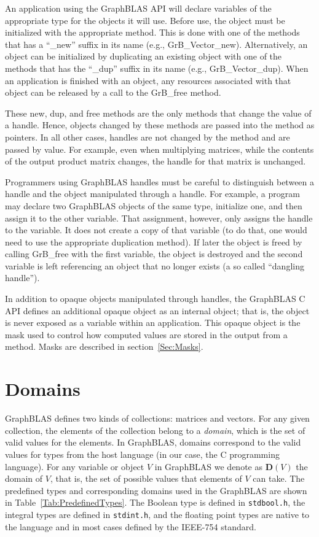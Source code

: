 An application using the GraphBLAS API will declare variables of the appropriate
type for the objects it will use.  Before use, the object must be initialized with 
the appropriate method.  This is done with one of the methods that has a ``{\sf \_new}'' suffix in its 
name (e.g., {\sf GrB\_Vector\_new}).  Alternatively, an object can be initialized by duplicating
an existing object with one of the methods that has the ``{\sf \_dup}'' suffix in its 
name  (e.g., {\sf GrB\_Vector\_dup}).   When an application is finished with 
an object, any resources associated with that object can be released by a
call to the {\sf GrB\_free} method.    

These {\sf new}, {\sf dup}, and {\sf free} methods are the only methods that 
change the value of a handle.  Hence, objects changed by these methods are passed
into the method as pointers.  In all other cases, handles are not changed by the 
method and are passed by value.  For example, even when multiplying matrices, 
while the contents of the output product matrix changes, the handle for that matrix is unchanged. 

Programmers using GraphBLAS handles must be careful to distinguish between a handle and the 
object manipulated through a handle.  For example, a program may declare two 
GraphBLAS objects of the same type, initialize one, and then assign it to the other
variable.  That assignment, however, only assigns the handle to the variable.  It does not 
create a copy of that variable (to do that, one would need to use the appropriate duplication method).
If later the object is freed by calling {\sf GrB\_free} with the first variable, the object
is destroyed and the second variable is left referencing an object that no longer 
exists (a so called ``dangling handle'').

In addition to opaque objects manipulated through handles, the GraphBLAS C API defines
an additional opaque object as an internal object; that is, the object is never exposed as
a variable within an application.  This opaque object is the mask used to
control how computed values are stored in the output from a method.  Masks 
are described in section~\ref{Sec:Masks}.

\section{Domains}

GraphBLAS defines two kinds of collections: matrices and vectors.
For any given collection, the elements of the collection belong to
a \emph{domain}, which is the set of valid values for the elements.
In GraphBLAS, domains correspond to the valid values for types from
the host language (in our case, the C programming language).  For any
variable or object $V$ in GraphBLAS we denote as $\mathbf{D}(V)$ the
domain of $V$, that is, the set of possible values that elements of
$V$ can take.  The predefined types and corresponding domains used in the 
GraphBLAS are shown in Table~\ref{Tab:PredefinedTypes}.  The Boolean
type is defined in {\tt stdbool.h}, the integral types are defined in
{\tt stdint.h}, and the floating point types are native to the language
and in most cases defined by the IEEE-754 standard.



